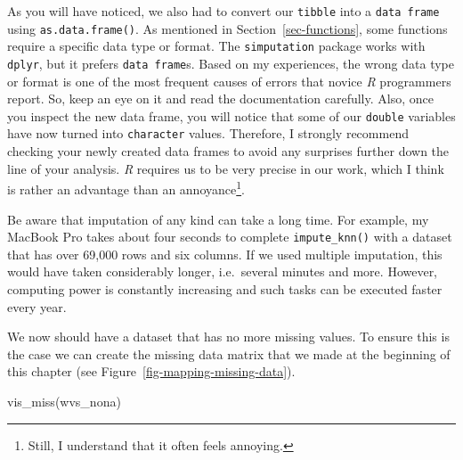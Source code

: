 \documentclass[
  letterpaper,
]{krantz}
\makeatletter
\newenvironment{Shaded}{\begin{snugshade}}{\end{snugshade}}
\newcommand{\FunctionTok}[1]{\textcolor[rgb]{0.28,0.35,0.67}{#1}}
\newcommand{\NormalTok}[1]{\textcolor[rgb]{0.00,0.23,0.31}{#1}}
\newenvironment{kframe}{%
\medskip{}
\setlength{\fboxsep}{.8em}
 \def\at@end@of@kframe{}%
 \ifinner\ifhmode%
  \def\at@end@of@kframe{\end{minipage}}%
  \begin{minipage}{\columnwidth}%
 \fi\fi%
 \def\FrameCommand##1{\hskip\@totalleftmargin \hskip-\fboxsep
 \colorbox{shadecolor}{##1}\hskip-\fboxsep
     \hskip-\linewidth \hskip-\@totalleftmargin \hskip\columnwidth}%
 \MakeFramed {\advance\hsize-\width
   \@totalleftmargin\z@ \linewidth\hsize
   \@setminipage}}%
 {\par\unskip\endMakeFramed%
 \at@end@of@kframe}
\renewenvironment{Shaded}{\begin{kframe}}{\end{kframe}}
\makeatother
\begin{document}
As you will have noticed, we also had to convert our \texttt{tibble}
into a \texttt{data\ frame} using \texttt{as.data.frame()}. As mentioned
in Section~\ref{sec-functions}, some functions require a specific data
type or format. The \texttt{simputation} package works with
\texttt{dplyr}, but it prefers \texttt{data\ frame}s. Based on my
experiences, the wrong data type or format is one of the most frequent
causes of errors that novice \emph{R} programmers report. So, keep an
eye on it and read the documentation carefully. Also, once you inspect
the new data frame, you will notice that some of our \texttt{double}
variables have now turned into \texttt{character} values. Therefore, I
strongly recommend checking your newly created data frames to avoid any
surprises further down the line of your analysis. \emph{R} requires us
to be very precise in our work, which I think is rather an advantage
than an annoyance\footnote{Still, I understand that it often feels
  annoying.}.

Be aware that imputation of any kind can take a long time. For example,
my MacBook Pro takes about four seconds to complete
\texttt{impute\_knn()} with a dataset that has over 69,000 rows and six
columns. If we used multiple imputation, this would have taken
considerably longer, i.e.~several minutes and more. However, computing
power is constantly increasing and such tasks can be executed faster
every year.

We now should have a dataset that has no more missing values. To ensure
this is the case we can create the missing data matrix that we made at
the beginning of this chapter (see
Figure~\ref{fig-mapping-missing-data}).

\begin{Shaded}
\begin{Highlighting}[]
\FunctionTok{vis\_miss}\NormalTok{(wvs\_nona)}
\end{Highlighting}
\end{Shaded}
\end{document}
